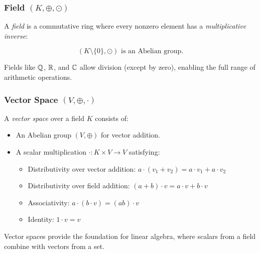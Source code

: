 \subsubsection{Field \texorpdfstring{\((K, \oplus, \odot)\)}{}}
A \emph{field} is a commutative ring where every nonzero element has a \emph{multiplicative inverse}:

\[
  (K \setminus \{0\}, \odot) \text{ is an Abelian group}.
\]

Fields like \(\mathbb{Q}\), \(\mathbb{R}\), and \(\mathbb{C}\) allow division (except by zero), enabling the full range of arithmetic operations.

\subsubsection{Vector Space \texorpdfstring{\((V, \oplus, \cdot)\)}{}}

A \emph{vector space} over a field \(K\) consists of:
\begin{itemize}
  \item An Abelian group \((V, \oplus)\) for vector addition.
  \item A scalar multiplication \(\cdot: K \times V \to V\) satisfying:
  \begin{itemize}
    \item Distributivity over vector addition: \(a \cdot (v_1 + v_2) = a \cdot v_1 + a \cdot v_2\)
    \item Distributivity over field addition: \((a + b) \cdot v = a \cdot v + b \cdot v\)
    \item Associativity: \(a \cdot (b \cdot v) = (ab) \cdot v\)
    \item Identity: \(1 \cdot v = v\)
  \end{itemize}
\end{itemize}

Vector spaces provide the foundation for linear algebra, where scalars from a field combine with vectors from a set.

